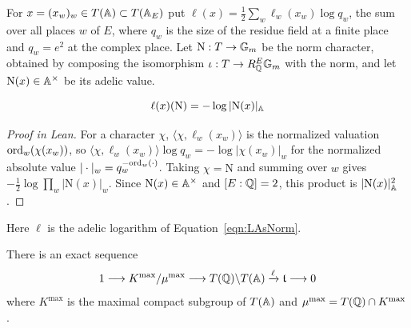 \begin{equationnode}

\label{eqn:LAsNorm}


\leanok

For $x=(x_w)_w\in T(\AA)\subset T(\AA_E)$ put $\ell(x)=\tfrac12\sum_w\ell_w(x_w)\log q_w$, the sum over all places $w$ of $E$, where $q_w$ is the size of the residue field at a finite place and $q_w=e^2$ at the complex place. Let $\mathrm N:T\to\GG_m$ be the norm character, obtained by composing the isomorphism $\iota:T\to R^E_\QQ\GG_m$ with the norm, and let $\mathrm N(x)\in\AA^\times$ be its adelic value.

\begin{equation*} \ell(x)(\mathrm{N}) = -\log |\mathrm{N}(x)|_{\AA} \end{equation*}

\end{equationnode}

\begin{proof}[Proof in Lean]

\leanok


For a character $\chi$, $\langle\chi,\ell_w(x_w)\rangle$ is the normalized valuation $\ord_w(\chi(x_w))$, so $\langle\chi,\ell_w(x_w)\rangle\log q_w=-\log|\chi(x_w)|_w$ for the normalized absolute value $|\cdot|_w=q_w^{-\ord_w(\cdot)}$. Taking $\chi=\mathrm N$ and summing over $w$ gives $-\tfrac12\log\prod_w|\mathrm N(x)|_w$. Since $\mathrm N(x)\in\AA^\times$ and $[E:\QQ]=2$, this product is $|\mathrm N(x)|_\AA^2$.

\end{proof}

\begin{proposition}

\label{prop:Lmap}


\leanok

Here $\ell$ is the adelic logarithm of Equation~\ref{eqn:LAsNorm}.

 There is an exact sequence \begin{equation*} 1 \longrightarrow K^{\mathrm{max}}/\mu^{\mathrm{max}} \longrightarrow T(\mathbb Q)\backslash T(\AA) \xlongrightarrow{\ell} \mathfrak t \longrightarrow 0 \end{equation*} where $K^{\mathrm{max}}$ is the maximal compact subgroup of $T(\AA)$ and $\mu^{\mathrm{max}} = T(\QQ) \cap K^{\mathrm{max}}$. 

\end{proposition}


